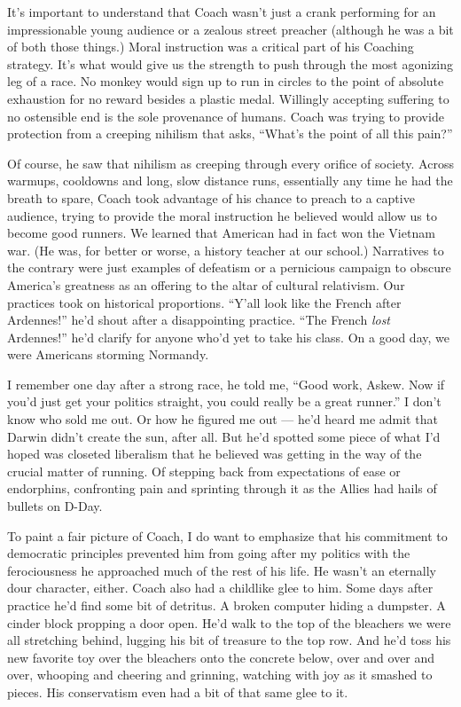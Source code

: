 \documentclass[14pt, oneside]{memoir}
\begin{document}
It's important to understand that Coach wasn't just a crank performing
for an impressionable young audience or a zealous street preacher
(although he was a bit of both those things.)
Moral instruction was a critical part of his Coaching strategy.
It's what would give us the strength to push through the most
agonizing leg of a race.
No monkey would sign up to run in circles to the point of absolute
exhaustion for no reward besides a plastic medal.
Willingly accepting suffering to no ostensible end is the sole
provenance of humans.
Coach was trying to provide protection from a creeping nihilism that
asks, ``What's the point of all this pain?''

Of course, he saw that nihilism as creeping through every orifice of
society.
Across warmups, cooldowns and long, slow distance runs, essentially
any time he had the breath to spare, Coach took advantage of his
chance to preach to a captive audience, trying to provide the moral
instruction he believed would allow us to become good runners.
We learned that American had in fact won the Vietnam war.
(He was, for better or worse, a history teacher at our school.)
Narratives to the contrary were just examples of defeatism or a
pernicious campaign to obscure America's greatness as an offering to
the altar of cultural relativism.
Our practices took on historical proportions.
``Y'all look like the French after Ardennes!'' he'd shout after a
disappointing practice.
``The French \textit{lost} Ardennes!'' he'd clarify for anyone who'd
yet to take his class.
On a good day, we were Americans storming Normandy.

I remember one day after a strong race, he told me, ``Good work,
Askew. Now if you'd just get your politics straight, you could really
be a great runner.''
I don't know who sold me out.
Or how he figured me out --- he'd heard me admit that Darwin didn't
create the sun, after all.
But he'd spotted some piece of what I'd hoped was closeted liberalism
that he believed was getting in the way of the crucial matter of
running.
Of stepping back from expectations of ease or endorphins, confronting
pain and sprinting through it as the Allies had hails of bullets on
D-Day.

To paint a fair picture of Coach, I do want to emphasize that his
commitment to democratic principles prevented him from going after my
politics with the ferociousness he approached much of the rest of his
life.
He wasn't an eternally dour character, either.
Coach also had a childlike glee to him.
Some days after practice he'd find some bit of detritus.
A broken computer hiding a dumpster.
A cinder block propping a door open.
He'd walk to the top of the bleachers we were all stretching behind,
lugging his bit of treasure to the top row.
And he'd toss his new favorite toy over the bleachers onto the
concrete below, over and over and over, whooping and cheering and
grinning, watching with joy as it smashed to pieces.
His conservatism even had a bit of that same glee to it.
\end{document}
